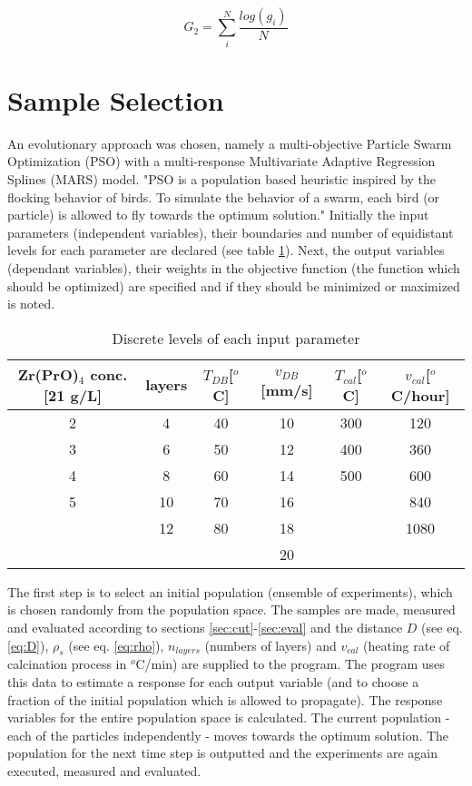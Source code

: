 \documentclass[a4paper]{article}
\begin{document}
\begin{equation}
	G_2 =  \sum_i^N \frac{log(g_i)}{N}
\end{equation}

\section{Sample Selection}
\label{sec:ss}
An evolutionary approach was chosen, namely a multi-objective Particle Swarm Optimization (PSO) with a multi-response
Multivariate Adaptive Regression Splines (MARS) model\cite{Villanova2010,Kennedy1995,Breiman1997,Carta2011}.
%
"PSO is a population based heuristic inspired by the flocking behavior of birds. 
To simulate the behavior of a swarm, each bird (or particle) is allowed to fly towards the optimum solution."\cite{Villanova2010}
%
Initially the input parameters (independent variables), their boundaries and number of equidistant levels for each parameter are declared (see table \ref{tab:input}).
Next, the output variables (dependant variables), their weights in the objective function (the function which should be optimized) are specified and if they should be minimized or maximized is noted.
%
\begin{table}[htb]
	\centering
	\begin{tabular}{cc cc cc}
		\hline
		Zr(PrO)$_4$ conc. [21 g/L]	&layers	&$T_{DB}$[$^o$C]	&$v_{DB}$[mm/s]	&$T_{cal}$[$^o$C]	&$v_{cal}$[$^o$C/hour]	\\
		\hline
		2				&4		&40					&10				&300				&120	\\
		3				&6		&50					&12				&400				&360	\\
		4				&8		&60					&14				&500				&600	\\
		5				&10		&70					&16				&					&840	\\
						&12		&80					&18				&					&1080	\\
						&		&					&20				&					&		\\
		\hline
	\end{tabular}
	\caption{Discrete levels of each input parameter}
	\label{tab:input}
\end{table}

The first step is to select an initial population (ensemble of experiments), which is chosen randomly from the population space. 
The samples are made, measured and evaluated according to sections \ref{sec:cut}-\ref{sec:eval} and the distance $D$ (see eq. \ref{eq:D}), $\rho_s$ (see eq. \ref{eq:rho}), $n_{layers}$ (numbers of layers) and $v_{cal}$ (heating rate of calcination process in $^o$C/min) are supplied to the program. 
The program uses this data to estimate a response for each output variable (and to choose a fraction of the initial population which is allowed to propagate).
The response variables for the entire population space is calculated. 
The current population - each of the particles independently - moves towards the optimum solution.
The population for the next time step is outputted and the experiments are again executed, measured and evaluated.





\end{document}
